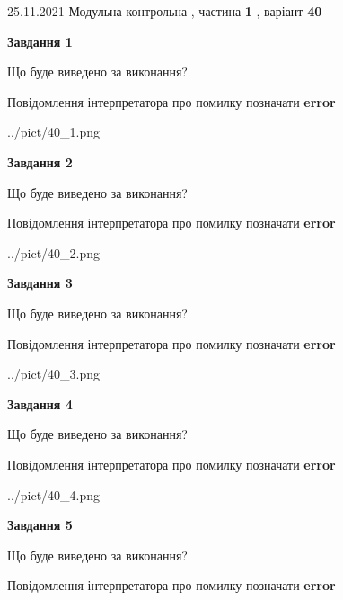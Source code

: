 \documentclass[10pt, ukrainian]{article}
\begin{document}
{25.11.2021 Модульна контрольна , частина \textbf { 1 }, варіант  \No \textbf { 40 }\par}
{
\begin {large}

{\begin {center}\textbf{Завдання 1}\end {center}}\par
Що буде виведено за виконання? \par
Повідомлення інтерпретатора про помилку позначати \textbf{error}

\begin{center}
	{../pict/40_1.png}
\end{center}
\newpage

{\begin {center}\textbf{Завдання 2}\end {center}}\par
Що буде виведено за виконання? \par
Повідомлення інтерпретатора про помилку позначати \textbf{error}

\begin{center}
	{../pict/40_2.png}
\end{center}
\newpage

{\begin {center}\textbf{Завдання 3}\end {center}}\par
Що буде виведено за виконання? \par
Повідомлення інтерпретатора про помилку позначати \textbf{error}

\begin{center}
	{../pict/40_3.png}
\end{center}
\newpage

{\begin {center}\textbf{Завдання 4}\end {center}}\par
Що буде виведено за виконання? \par
Повідомлення інтерпретатора про помилку позначати \textbf{error}

\begin{center}
	{../pict/40_4.png}
\end{center}
\newpage

{\begin {center}\textbf{Завдання 5}\end {center}}\par
Що буде виведено за виконання? \par
Повідомлення інтерпретатора про помилку позначати \textbf{error}


\end{large}}
\end{document}
